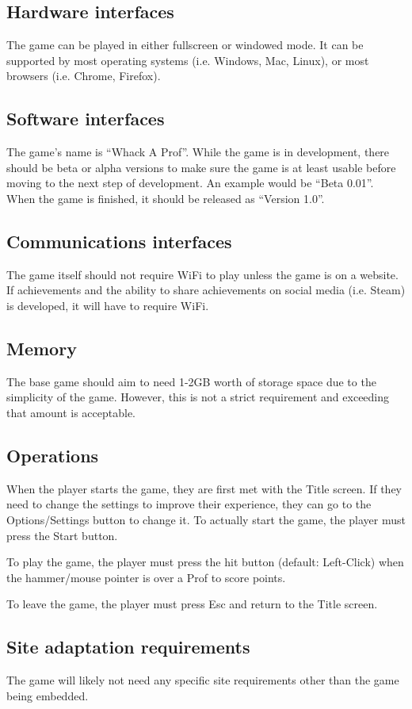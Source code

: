 \documentclass{article}
\begin{document}
\subsection{Hardware interfaces}
The game can be played in either fullscreen or windowed mode. It can be supported by most operating systems (i.e. Windows, Mac, Linux), or most browsers (i.e. Chrome, Firefox).

\subsection{Software interfaces}
The game’s name is “Whack A Prof”. While the game is in development, there should be beta or alpha versions to make sure the game is at least usable before moving to the next step of development. An example would be “Beta 0.01”. When the game is finished, it should be released as “Version 1.0”.

\subsection{Communications interfaces}
The game itself should not require WiFi to play unless the game is on a website. If achievements and the ability to share achievements on social media (i.e. Steam) is developed, it will have to require WiFi.

\subsection{Memory}
The base game should aim to need 1-2GB worth of storage space due to the simplicity of the game. However, this is not a strict requirement and exceeding that amount is acceptable.

\subsection{Operations}
When the player starts the game, they are first met with the Title screen. If they need to change the settings to improve their experience, they can go to the Options/Settings button to change it. To actually start the game, the player must press the Start button.

To play the game, the player must press the hit button (default: Left-Click) when the hammer/mouse pointer is over a Prof to score points.

To leave the game, the player must press Esc and return to the Title screen.

\subsection{Site adaptation requirements}
The game will likely not need any specific site requirements other than the game being embedded.
\end{document}
